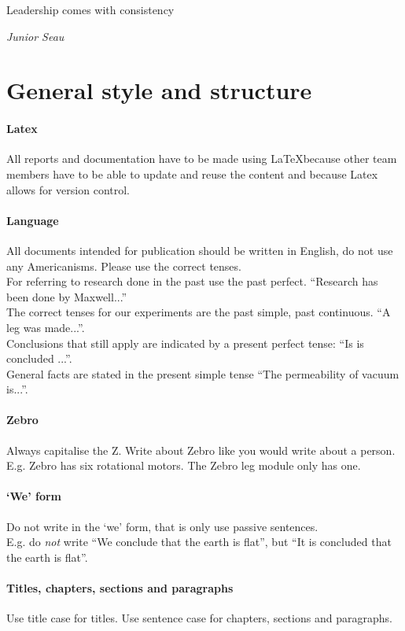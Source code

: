 \epigraph{Leadership comes with consistency}{\textit{Junior Seau}}
\section{General style and structure}
\paragraph{Latex}
All reports and documentation have to be made using \LaTeX  because other team members have to be able to update and reuse the content and because Latex allows for version control.

\paragraph{Language}
All documents intended for publication should be written in English, do not use any Americanisms. Please use the correct tenses.\\
For referring to research done in the past use the past perfect. ``Research has been done by Maxwell...''\\
The correct tenses for our experiments are the past simple, past continuous. ``A leg was made...''.\\
Conclusions that still apply are indicated by a present perfect tense: ``Is is concluded ...''.\\
General facts are stated in the present simple tense ``The permeability of vacuum is...''.

\paragraph{Zebro} Always capitalise the Z. Write about Zebro like you would write about a person. \\
E.g. Zebro has six rotational motors. The Zebro leg module only has one.

\paragraph{`We' form}
Do not write in the `we' form, that is only use passive sentences. \\
E.g. do \emph{not} write ``We conclude that the earth is flat'', but ``It is concluded that the earth is flat''.

\paragraph{Titles, chapters, sections and paragraphs}
Use title case for titles.
Use sentence case for chapters, sections and paragraphs.

